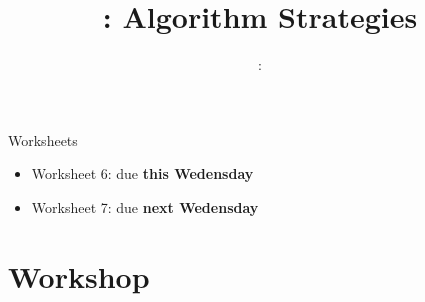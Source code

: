 \usepackage{../../beamerthemeFalmouthGamesAcademy}
\graphicspath{ {../../} }

\lstset{language=[Sharp]C
}

\usepackage[normalem]{ulem}
\usepackage{wasysym}

\usepackage{pdfpages}

\usepackage{algpseudocode}
\usepackage{qtree}

\usetikzlibrary{arrows,automata}
\usetikzlibrary{tikzmark,calc}




\title{\sessionnumber: Algorithm Strategies}
\subtitle{\modulecode: \moduletitle}

\frame{\titlepage} 

\begin{frame}{Worksheets}
	\begin{itemize}
		\item Worksheet 6: due \textbf{this Wedensday}
		\item Worksheet 7: due \textbf{next Wedensday}
	\end{itemize}
\end{frame}






\part{Workshop}
\frame{\partpage}



